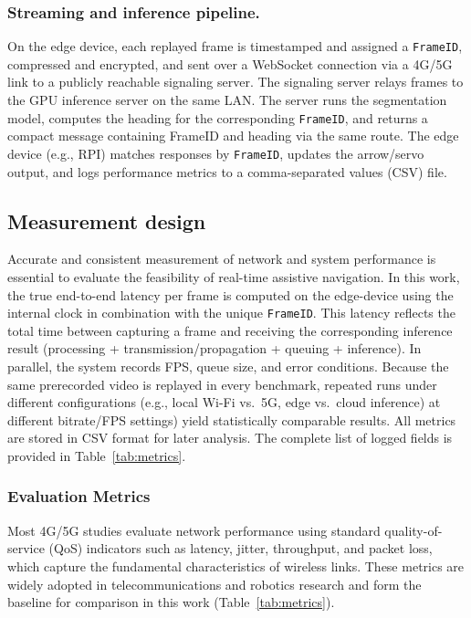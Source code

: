 \documentclass{ieeeaccess}
\begin{document}
\subsubsection{Streaming and inference pipeline.}
On the edge device, each replayed frame is timestamped and assigned a \texttt{FrameID}, compressed and encrypted, and sent over a WebSocket connection via a 4G/5G link to a publicly reachable signaling server. The signaling server relays frames to the GPU inference server on the same LAN. The server runs the segmentation model, computes the heading for the corresponding \texttt{FrameID}, and returns a compact message containing FrameID and heading via the same route. The edge device (e.g., RPI) matches responses by \texttt{FrameID}, updates the arrow/servo output, and logs performance metrics to a comma-separated values (CSV) file.

\subsection{Measurement design}

Accurate and consistent measurement of network and system performance is essential to evaluate the feasibility of real-time assistive navigation. In this work, the true end-to-end latency per frame is computed on the edge-device using the internal clock in combination with the unique \texttt{FrameID}. This latency reflects the total time between capturing a frame and receiving the corresponding inference result (processing + transmission/propagation + queuing + inference). In parallel, the system records FPS, queue size, and error conditions. Because the same prerecorded video is replayed in every benchmark, repeated runs under different configurations (e.g., local Wi-Fi vs.\ 5G, edge vs.\ cloud inference) at different bitrate/FPS settings) yield statistically comparable results. All metrics are stored in CSV format for later analysis. The complete list of logged fields is provided in Table~\ref{tab:metrics}.

\subsubsection{Evaluation Metrics}

Most 4G/5G studies evaluate network performance using standard quality-of-service (QoS) indicators such as latency, jitter, throughput, and packet loss, which capture the fundamental characteristics of wireless links. These metrics are widely adopted in telecommunications and robotics research and form the baseline for comparison in this work (Table~\ref{tab:metrics}).
\end{document}
